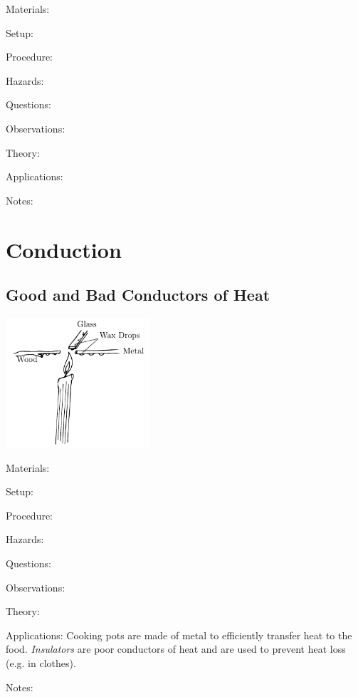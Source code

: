 \begin{multicols}{2}
\begin{description*}
\item[Materials:]{}
\item[Setup:]{}
\item[Procedure:]{}
\item[Hazards:]{}
\item[Questions:]{}
\item[Observations:]{}
\item[Theory:]{}
\item[Applications:]{}
\item[Notes:]{}
\end{description*}


\section*{Conduction}


\subsection{Good and Bad Conductors of Heat}

\begin{center}
\includegraphics[width=0.4\textwidth]{./img/heat-conduction.png}
\end{center}

\begin{description*}
\item[Materials:]{}
\item[Setup:]{}
\item[Procedure:]{}
\item[Hazards:]{}
\item[Questions:]{}
\item[Observations:]{}
\item[Theory:]{}
\item[Applications:]{Cooking pots are made of metal to efficiently transfer heat to the food. \emph{Insulators} are poor conductors of heat and are used to prevent heat loss (e.g. in clothes).}
\item[Notes:]{}
\end{description*}


\end{multicols}
